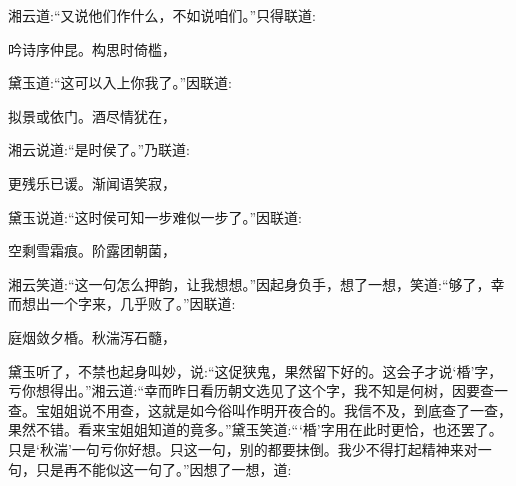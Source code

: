 \begin{parag}
    湘云道:“又说他们作什么，不如说咱们。”只得联道:
\end{parag}


\begin{poem}
    \begin{pl}吟诗序仲昆。构思时倚槛，\end{pl}
\end{poem}


\begin{parag}
    黛玉道:“这可以入上你我了。”因联道:
\end{parag}


\begin{poem}
    \begin{pl}拟景或依门。酒尽情犹在，\end{pl}
\end{poem}


\begin{parag}
    湘云说道:“是时侯了。”乃联道:
\end{parag}


\begin{poem}
    \begin{pl}更残乐已谖。渐闻语笑寂，\end{pl}
\end{poem}


\begin{parag}
    黛玉说道:“这时侯可知一步难似一步了。”因联道:
\end{parag}


\begin{poem}
    \begin{pl}空剩雪霜痕。阶露团朝菌，\end{pl}
\end{poem}


\begin{parag}
    湘云笑道:“这一句怎么押韵，让我想想。”因起身负手，想了一想，笑道:“够了，幸而想出一个字来，几乎败了。”因联道:
\end{parag}


\begin{poem}
    \begin{pl}庭烟敛夕棔。秋湍泻石髓，\end{pl}
\end{poem}


\begin{parag}
    黛玉听了，不禁也起身叫妙，说:“这促狭鬼，果然留下好的。这会子才说‘棔’字，亏你想得出。”湘云道:“幸而昨日看历朝文选见了这个字，我不知是何树，因要查一查。宝姐姐说不用查，这就是如今俗叫作明开夜合的。我信不及，到底查了一查，果然不错。看来宝姐姐知道的竟多。”黛玉笑道:“‘棔’字用在此时更恰，也还罢了。只是‘秋湍’一句亏你好想。只这一句，别的都要抹倒。我少不得打起精神来对一句，只是再不能似这一句了。”因想了一想，道:
\end{parag}


